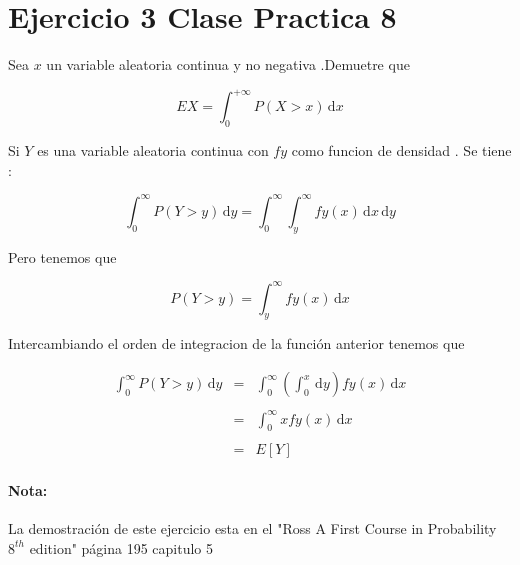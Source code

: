 \documentclass{article}
\begin{document}
    \section*{Ejercicio 3 Clase Practica 8}

    \begin{flushleft}
        
    
        Sea  $x$ un variable aleatoria continua y no negativa .Demuetre que 

        \begin{equation*}
            EX = \int_{0}^{+ \infty} P \left(X > x \right)  \,\mathrm{d}x 
        \end{equation*}

        Si $Y$ es una variable aleatoria continua con $fy$ como funcion de densidad .
        Se tiene : 

        \begin{equation*}
            \int_{0}^{\infty} P \left(Y > y\right)  \,\mathrm{d}y =  
            \int_{0}^{\infty} \int_{y}^{\infty}  fy \left(x\right)\,\mathrm{d}x  \,\mathrm{d}y
        \end{equation*}

        Pero tenemos que  

        \begin{equation*}
            P \left(Y > y \right) = 
            \int_{y}^{\infty} fy \left(x\right) \,\mathrm{d}x 
        \end{equation*}

        Intercambiando el orden de integracion de la funci\'on  anterior tenemos que 

        \begin{equation*}
            \begin{array}{rcl}
                \int_{0}^{\infty} P \left(Y > y \right) \,\mathrm{d}y &  =  &  \int_{0}^{\infty} \left(\int_{0}^{x}  \,\mathrm{d}y \right) fy\left(x\right) \,\mathrm{d}x 
                \\
                \\
                                                                    &  =  &  \int_{0}^{\infty} x fy\left(x\right) \,\mathrm{d}x
                \\
                \\
                                                                    &  =  &  E\left[Y\right]                                           
            \end{array}
        \end{equation*}

        \paragraph{Nota:} La demostraci\'on de este ejercicio esta en el "Ross A First Course in Probability $8^{th}$ edition"  p\'agina 195 capitulo 5

    \end{flushleft}
\end{document}
